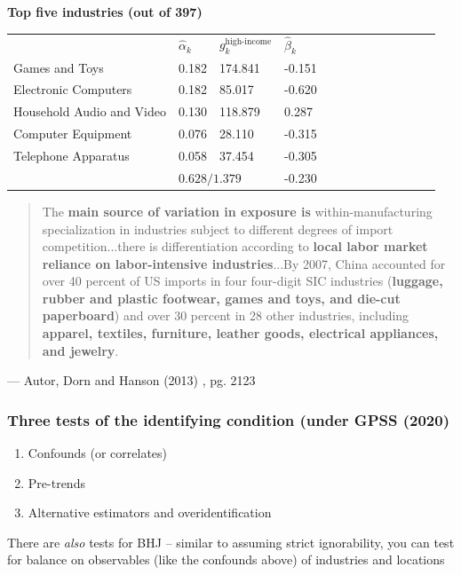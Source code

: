 \documentclass[notes,11pt, aspectratio=169]{beamer}
\newenvironment{wideitemize}{\itemize\addtolength{\itemsep}{10pt}}{\enditemize}
\begin{document}
\begin{frame}[label=top5weights]
\textbf{Top five industries (out of 397)}



\begin{center}
\begin{tabular}{lllllllllllll}
\toprule
& $\hat{\alpha}_k$ & $g_k^{\text{high-income}}$ & $\hat{\beta}_k$  \\ \cmidrule(lr){2-4} 
Games and Toys & 0.182 & 174.841 & -0.151  \\  
Electronic Computers & 0.182 & 85.017 & -0.620  \\ 
Household Audio and Video & 0.130 & 118.879 & 0.287  \\ 
Computer Equipment & 0.076 & 28.110 & -0.315  \\ 
Telephone Apparatus & 0.058 & 37.454 & -0.305  \\ 
\bottomrule 
& \multicolumn{2}{l}{$0.628 \big/ 1.379$}   & -0.230 &\\
\end{tabular}
\end{center}
  
\footnotesize
\medskip
\begin{quote}
The \textbf{main source of variation in exposure is} within-manufacturing specialization in industries subject to different degrees of import competition...there is differentiation according to \textbf{local labor market reliance on labor-intensive industries}...By 2007, China accounted for over 40 percent of US imports in four four-digit SIC industries (\textbf{luggage, rubber and plastic footwear, games and toys, and die-cut paperboard}) and over 30 percent in 28 other industries, including \textbf{apparel, textiles, furniture, leather goods, electrical appliances, and jewelry}.
\end{quote}
\begin{center}
--- Autor, Dorn and Hanson (2013) , pg. 2123
\end{center}

\end{frame}


\begin{frame}
\frametitle{Three tests of the identifying condition (under GPSS (2020)}

\begin{enumerate}
\item Confounds (or correlates)
\item Pre-trends 
\item Alternative estimators and overidentification
\end{enumerate}

\begin{wideitemize}
\item There are \emph{also} tests for BHJ -- similar to assuming
  strict ignorability, you can test for balance on observables
  (like the confounds above) of industries and locations
\end{wideitemize}

\end{frame}
\end{document}
